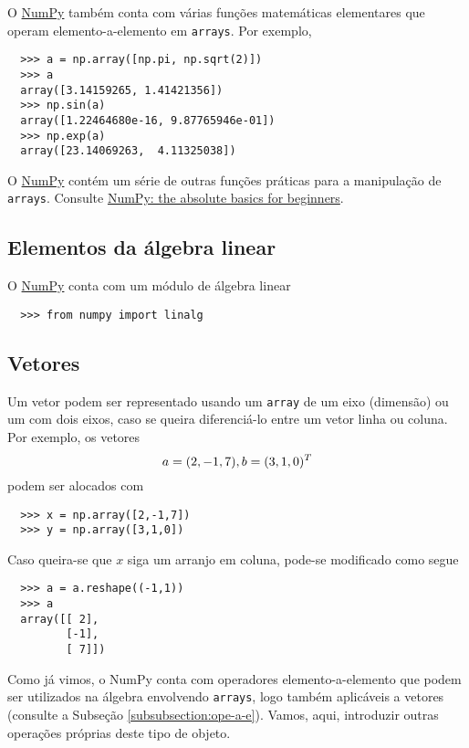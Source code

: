\documentclass[12pt]{article}
\begin{document}
O \href{https://numpy.org/}{NumPy} também conta com várias funções matemáticas elementares que operam elemento-a-elemento em \lstinline+arrays+. Por exemplo,
\begin{lstlisting}
  >>> a = np.array([np.pi, np.sqrt(2)])
  >>> a
  array([3.14159265, 1.41421356])
  >>> np.sin(a)
  array([1.22464680e-16, 9.87765946e-01])
  >>> np.exp(a)
  array([23.14069263,  4.11325038])
\end{lstlisting}
 
\begin{obs}
O \href{https://numpy.org/}{NumPy} contém um série de outras funções práticas para a manipulação de \lstinline+arrays+. Consulte \href{https://numpy.org/doc/stable/user/absolute_beginners.html\#numpy-the-absolute-basics-for-beginners}{NumPy: the absolute basics for beginners}.  
\end{obs}

\subsection{Elementos da álgebra linear}

O \href{https://numpy.org/}{NumPy} conta com um módulo de álgebra linear
\begin{lstlisting}
  >>> from numpy import linalg
\end{lstlisting}

\subsection{Vetores}

Um vetor podem ser representado usando um \lstinline+array+ de um eixo (dimensão) ou um com dois eixos, caso se queira diferenciá-lo entre um vetor linha ou coluna. Por exemplo, os vetores
\begin{equation}
  a = (2, -1, 7),\\
  b = (3, 1, 0)^T
\end{equation}
podem ser alocados com
\begin{lstlisting}
  >>> x = np.array([2,-1,7])
  >>> y = np.array([3,1,0])
\end{lstlisting}
Caso queira-se que $x$ siga um arranjo em coluna, pode-se modificado como segue
\begin{lstlisting}
  >>> a = a.reshape((-1,1))
  >>> a
  array([[ 2],
         [-1],
         [ 7]])
\end{lstlisting}

Como já vimos, o NumPy conta com operadores elemento-a-elemento que podem ser utilizados na álgebra envolvendo \lstinline+arrays+, logo também aplicáveis a vetores (consulte a Subseção \ref{subsubsection:ope-a-e}). Vamos, aqui, introduzir outras operações próprias deste tipo de objeto.
\end{document}
